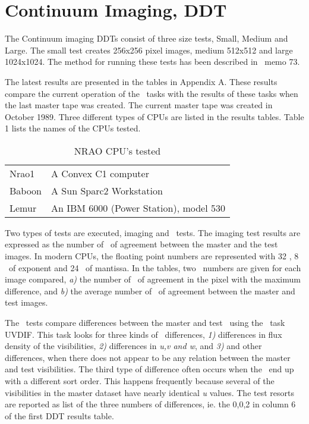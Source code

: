 \section{Continuum Imaging, DDT}
The Continuum imaging DDTs consist of three size tests, Small, Medium
and Large.  The small test creates 256x256 pixel images, medium
512x512 and large 1024x1024.
The method for running these tests has been described in
\AIPS\ memo 73.

The latest results are presented in the tables in Appendix A.
These results compare the current operation of the \AIPS\ tasks
with the results of these tasks when the
last master tape was created.
The current master tape was created in October 1989.
Three different types of CPUs are listed in the results tables.
Table 1 lists the names of the CPUs tested.


\begin{table}\begin{center}
\begin{tabular}{ll}
\hline \hline
Nrao1  &  A Convex C1 computer \\
Baboon &  A Sun Sparc2 Workstation  \\
Lemur  & An IBM 6000 (Power Station), model 530  \\
\hline \hline
\end{tabular}
\end{center}
\caption{NRAO CPU's tested}
\end{table}

Two types of tests are executed, imaging and \uvdata\ tests.
The imaging test results are expressed as the number of \bits\
of agreement between the master and the test images.
In modern CPUs, the floating point numbers are
represented with 32 \bits, 8 \bits\ of exponent and 24 \bits\
of mantissa.
In the tables, two \bits\ numbers are given for each image compared,
{\it a)} the number of \bits\ of agreement in the pixel with the
maximum difference, and
{\it b)} the average number of \bits\ of agreement between the master
and test images.

The \uvdata\ tests compare differences between the master and test
\uvdata\ using the \AIPS\ task UVDIF.
This task looks for three kinds of \uvdata\ differences,
{\it 1)} differences in flux density of the visibilities,
{\it 2)} differences in {\it u,v and w}, and
{\it 3)} and other differences, when there does not appear to
be any relation between the master and test visibilities.
The third type of difference often occurs when the \uvdata\ end
up with a different sort order.  This happens frequently because
several of the visibilities in the master dataset have nearly identical
{\it u} values.  The test resorts are reported as list of the three
numbers of differences, ie. the 0,0,2 in column 6 of the first
DDT results table.

